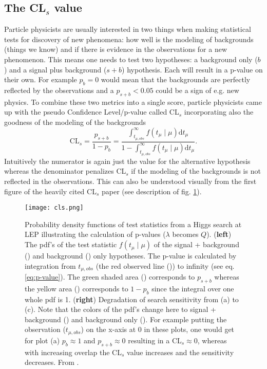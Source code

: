 \subsection{The CL$_s$ value}\label{sec:cls}

Particle physicists are usually interested in two things when making statistical tests for discovery of new phenomena: how well is the modeling of backgrounds (things we know) and if there is evidence in the observations for a new phenomenon. This means one needs to test two hypotheses: a background only ($b$) and a signal plus background ($s+b$) hypothesis. Each will result in a p-value on their own. For example $p_{b}=0$ would mean that the backgrounds are perfectly reflected by the observations and a $p_{s+b} < 0.05$ could be a sign of e.g. new physics. To combine these two metrics into a single score, particle physicists came up with the pseudo Confidence Level/p-value called CL$_s$ incorporating also the goodness of the modeling of the backgrounds 
\begin{equation}
    \mathrm{CL}_s=\frac{p_{s+b}}{1-p_{b}}=
    \frac
    {\int_{t_{\mu ,obs}}^{\infty} 
    f(t_\mu \mid \mu) \mathrm{d}t_\mu}
    {1-\int_{t_{\mu ,obs}}^{\infty} 
    f(t_\mu \mid \mu) \mathrm{d}t_\mu}.
\end{equation}
Intuitively the numerator is again just the value for the alternative hypothesis whereas the denominator penalizes CL$_s$ if the modeling of the backgrounds is not reflected in the observations. This can also be understood visually from the first figure of the heavily cited CL$_s$ paper \citep{read2002presentation} (see description of fig. \ref{fig:cls}).
\begin{figure}
    \centering
    \texttt{[image: cls.png]}
        \caption[]{Probability density functions of test statistics from a Higgs search at LEP illustrating the calculation of p-values ($\lambda$ becomes $Q$). (\textbf{left}) The pdf's of the test statistic $f(t_\mu \mid \mu)$ of the signal + background ({\color[HTML]{804000}{$\diagup$}}) and background ({\color[HTML]{2100FF}{$\diagup$}}) only hypotheses. The p-value is calculated by integration from $t_{\mu,obs}$ (the red observed line ({\color[HTML]{FF0000}{$\diagup$}})) to infinity (see eq. \ref{eq:p-value}). The green shaded area () corresponds to $p_{s+b}$ whereas the yellow area () corresponds to $1-p_b$ since the integral over one whole pdf is 1. (\textbf{right}) Degradation of search sensitivity from (a) to (c). Note that the colors of the pdf's change here to signal + background () and background only (). For example putting the observation ($t_{\mu,obs}$) on the x-axis at 0 in these plots, one would get for plot (a) $p_{b}\approx 1$ and $p_{s+b}\approx 0$ resulting in a CL$_s\approx 0$, whereas with increasing overlap the CL$_s$ value increases and the sensitivity decreases.
        From \citep{read2002presentation}.}
    \label{fig:cls}    
\end{figure}



